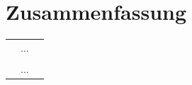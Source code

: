 \chapter{Zusammenfassung}\label{chap:zusammenfassung}

\vfill

\begin{tabularx}{1\textwidth}{ p{1 cm} X p{1 cm} }

    {} & {
        ...
    } & {}\\

    \vspace{2\baselineskip}\\

    {} & {
        ...
    } & {}\\

\end{tabularx}

\vfill
